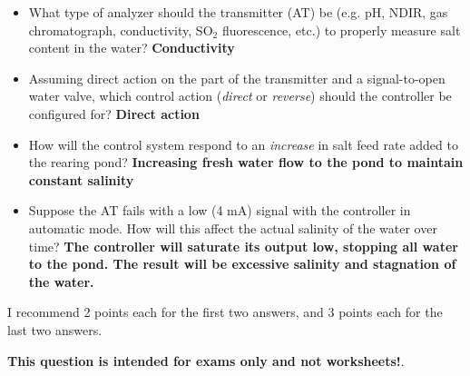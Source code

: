 \begin{itemize}
\item{} What type of analyzer should the transmitter (AT) be (e.g. pH, NDIR, gas chromatograph, conductivity, SO$_{2}$ fluorescence, etc.) to properly measure salt content in the water?  {\bf Conductivity}
\vskip 10pt
\item{} Assuming direct action on the part of the transmitter and a signal-to-open water valve, which control action ({\it direct} or {\it reverse}) should the controller be configured for?  {\bf Direct action}
\vskip 10pt
\item{} How will the control system respond to an {\it increase} in salt feed rate added to the rearing pond?  {\bf Increasing fresh water flow to the pond to maintain constant salinity}
\vskip 10pt
\item{} Suppose the AT fails with a low (4 mA) signal with the controller in automatic mode.  How will this affect the actual salinity of the water over time?  {\bf The controller will saturate its output low, stopping all water to the pond.  The result will be excessive salinity and stagnation of the water.}
\end{itemize}

I recommend 2 points each for the first two answers, and 3 points each for the last two answers.







{\bf This question is intended for exams only and not worksheets!}.

